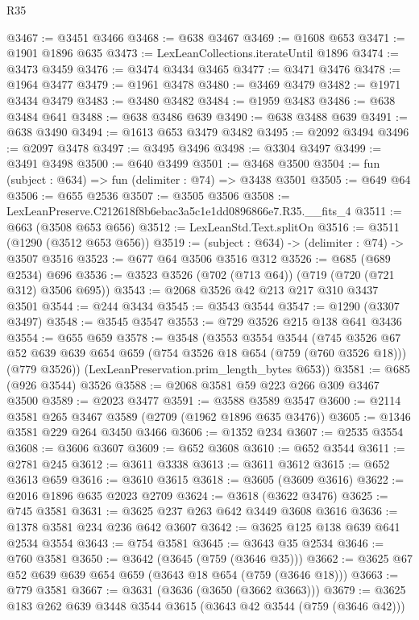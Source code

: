 \begin{lexlean}{R35}
\begin{coremodule}
@3467 := @3451 @3466
@3468 := @638 @3467
@3469 := @1608 @653
@3471 := @1901 @1896 @635
@3473 := LexLeanCollections.iterateUntil @1896
@3474 := @3473 @3459
@3476 := @3474 @3434 @3465
@3477 := @3471 @3476
@3478 := @1964 @3477
@3479 := @1961 @3478
@3480 := @3469 @3479
@3482 := @1971 @3434 @3479
@3483 := @3480 @3482
@3484 := @1959 @3483
@3486 := @638 @3484 @641
@3488 := @638 @3486 @639
@3490 := @638 @3488 @639
@3491 := @638 @3490
@3494 := @1613 @653 @3479 @3482
@3495 := @2092 @3494
@3496 := @2097 @3478
@3497 := @3495 @3496
@3498 := @3304 @3497
@3499 := @3491 @3498
@3500 := @640 @3499
@3501 := @3468 @3500
@3504 := fun (subject : @634) => fun (delimiter : @74) => @3438 @3501
@3505 := @649 @64
@3506 := @655 @2536
@3507 := @3505 @3506
@3508 := LexLeanPreserve.C212618f8b6ebac3a5c1e1dd0896866e7.R35.__fits_4
@3511 := @663 (@3508 @653 @656)
@3512 := LexLeanStd.Text.splitOn
@3516 := @3511 (@1290 (@3512 @653 @656))
@3519 := (subject : @634) -> (delimiter : @74) -> @3507 @3516
@3523 := @677 @64 @3506 @3516 @312
@3526 := @685 (@689 @2534) @696
@3536 := @3523 @3526 (@702 (@713 @64)) (@719 (@720 (@721 @312) @3506 @695))
@3543 := @2068 @3526 @42 @213 @217 @310 @3437 @3501
@3544 := @244 @3434
@3545 := @3543 @3544
@3547 := @1290 (@3307 @3497)
@3548 := @3545 @3547
@3553 := @729 @3526 @215 @138 @641 @3436
@3554 := @655 @659
@3578 := @3548
    (@3553
      @3554
      @3544
      (@745
        @3526
        @67
        @52
        @639
        @639
        @654
        @659
        (@754 @3526 @18 @654 (@759 (@760 @3526 @18)))
        (@779 @3526))
      (LexLeanPreservation.prim_length_bytes @653))
@3581 := @685 (@926 @3544) @3526
@3588 := @2068 @3581 @59 @223 @266 @309 @3467 @3500
@3589 := @2023 @3477
@3591 := @3588 @3589 @3547
@3600 := @2114 @3581 @265 @3467 @3589 (@2709 (@1962 @1896 @635 @3476))
@3605 := @1346 @3581 @229 @264 @3450 @3466
@3606 := @1352 @234
@3607 := @2535 @3554
@3608 := @3606 @3607
@3609 := @652 @3608
@3610 := @652 @3544
@3611 := @2781 @245
@3612 := @3611 @3338
@3613 := @3611 @3612
@3615 := @652 @3613 @659
@3616 := @3610 @3615
@3618 := @3605 (@3609 @3616)
@3622 := @2016 @1896 @635 @2023 @2709
@3624 := @3618 (@3622 @3476)
@3625 := @745 @3581
@3631 := @3625 @237 @263 @642 @3449 @3608 @3616
@3636 := @1378 @3581 @234 @236 @642 @3607
@3642 := @3625 @125 @138 @639 @641 @2534 @3554
@3643 := @754 @3581
@3645 := @3643 @35 @2534
@3646 := @760 @3581
@3650 := @3642 (@3645 (@759 (@3646 @35)))
@3662 := @3625 @67 @52 @639 @639 @654 @659 (@3643 @18 @654 (@759 (@3646 @18)))
@3663 := @779 @3581
@3667 := @3631 (@3636 (@3650 (@3662 @3663)))
@3679 := @3625 @183 @262 @639 @3448 @3544 @3615 (@3643 @42 @3544 (@759 (@3646 @42)))

\end{coremodule}
\end{lexlean}
